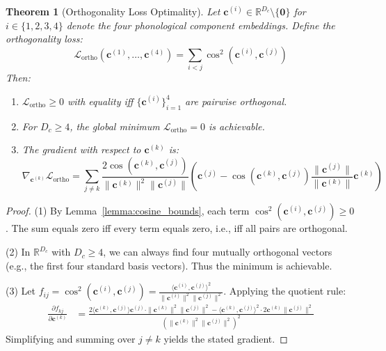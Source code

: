 \documentclass{article}
\newtheorem{theorem}{Theorem}[section]
\theoremstyle{definition}
\theoremstyle{remark}
\begin{document}
\begin{theorem}[Orthogonality Loss Optimality]
\label{thm:ortho}
Let $\mathbf{c}^{(i)} \in \mathbb{R}^{D_c} \setminus \{\mathbf{0}\}$ for $i \in \{1,2,3,4\}$ denote the four phonological component embeddings. Define the orthogonality loss:
\begin{equation}
\mathcal{L}_{\text{ortho}}(\mathbf{c}^{(1)}, \ldots, \mathbf{c}^{(4)}) = \sum_{i < j} \cos^2(\mathbf{c}^{(i)}, \mathbf{c}^{(j)})
\end{equation}
Then:
\begin{enumerate}[nosep]
\item $\mathcal{L}_{\text{ortho}} \geq 0$ with equality iff $\{\mathbf{c}^{(i)}\}_{i=1}^4$ are pairwise orthogonal.
\item For $D_c \geq 4$, the global minimum $\mathcal{L}_{\text{ortho}} = 0$ is achievable.
\item The gradient with respect to $\mathbf{c}^{(k)}$ is:
\begin{equation}
\nabla_{\mathbf{c}^{(k)}} \mathcal{L}_{\text{ortho}} = \sum_{j \neq k} \frac{2 \cos(\mathbf{c}^{(k)}, \mathbf{c}^{(j)})}{\|\mathbf{c}^{(k)}\|^2 \|\mathbf{c}^{(j)}\|} \left( \mathbf{c}^{(j)} - \cos(\mathbf{c}^{(k)}, \mathbf{c}^{(j)}) \frac{\|\mathbf{c}^{(j)}\|}{\|\mathbf{c}^{(k)}\|} \mathbf{c}^{(k)} \right)
\end{equation}
\end{enumerate}
\end{theorem}

\begin{proof}
(1) By Lemma~\ref{lemma:cosine_bounds}, each term $\cos^2(\mathbf{c}^{(i)}, \mathbf{c}^{(j)}) \geq 0$. The sum equals zero iff every term equals zero, i.e., iff all pairs are orthogonal.

(2) In $\mathbb{R}^{D_c}$ with $D_c \geq 4$, we can always find four mutually orthogonal vectors (e.g., the first four standard basis vectors). Thus the minimum is achievable.

(3) Let $f_{ij} = \cos^2(\mathbf{c}^{(i)}, \mathbf{c}^{(j)}) = \frac{\langle \mathbf{c}^{(i)}, \mathbf{c}^{(j)} \rangle^2}{\|\mathbf{c}^{(i)}\|^2 \|\mathbf{c}^{(j)}\|^2}$. Applying the quotient rule:
\begin{align}
\frac{\partial f_{kj}}{\partial \mathbf{c}^{(k)}} &= \frac{2\langle \mathbf{c}^{(k)}, \mathbf{c}^{(j)} \rangle \mathbf{c}^{(j)} \cdot \|\mathbf{c}^{(k)}\|^2 \|\mathbf{c}^{(j)}\|^2 - \langle \mathbf{c}^{(k)}, \mathbf{c}^{(j)} \rangle^2 \cdot 2\mathbf{c}^{(k)} \|\mathbf{c}^{(j)}\|^2}{(\|\mathbf{c}^{(k)}\|^2 \|\mathbf{c}^{(j)}\|^2)^2}
\end{align}
Simplifying and summing over $j \neq k$ yields the stated gradient.
\end{proof}
\end{document}
